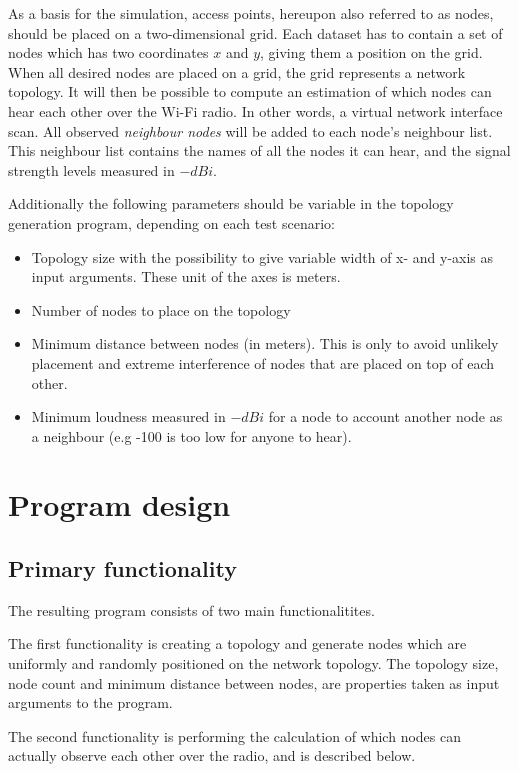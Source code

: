 As a basis for the simulation, access points, hereupon also referred to as nodes, should be placed on a two-dimensional grid. Each dataset has to contain a set of nodes which has two coordinates $x$ and $y$, giving them a position on the grid. When all desired nodes are placed on a grid, the grid represents a network topology. It will then be possible to compute an
estimation of which nodes can hear each other over the Wi-Fi radio. In other words, a virtual network interface scan. All observed \textit{neighbour nodes} will be added to each node's
neighbour list. This neighbour list contains the names of all the nodes it can hear, and the signal strength levels measured in $-dBi$.

Additionally the following parameters should be variable in the topology generation program, depending on each test scenario:

\begin{itemize}
	\item Topology size with the possibility to give variable width of x- and y-axis as input arguments. These unit of the axes is meters. 
	\item Number of nodes to place on the topology
	\item Minimum distance between nodes (in meters). This is only to avoid unlikely placement and extreme interference of nodes that are placed on top of each other. 
	\item Minimum loudness measured in $-dBi$ for a node to account another node as a neighbour (e.g -100 is too low for anyone to hear).
\end{itemize}


	\section{Program design}\label{prog_design}
	\subsection{Primary functionality}
	The resulting program consists of two main functionalitites.

	The first functionality is creating a topology and generate nodes which are uniformly
	and randomly positioned on the network topology. The topology size, node count and minimum distance
	between nodes, are properties taken as input arguments to the program.

	The second functionality is performing the calculation of which nodes can actually observe each other over the radio, and is described below.

